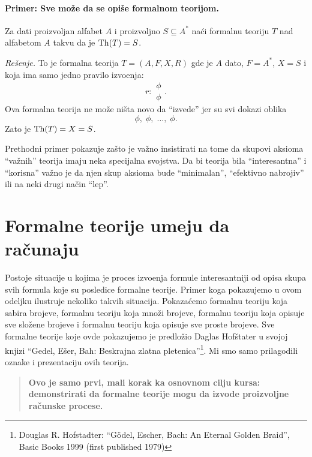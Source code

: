 \paragraph{Primer: Sve mo\v ze da se opi\v se formalnom teorijom.}
Za dati proizvoljan alfabet $A$ i proizvoljno $S \subseteq A^*$ na\'ci formalnu teoriju $T$ nad alfabetom
$A$ takvu da je $\mathrm{Th}(T) = S$.

\medskip

\noindent
\textit{Re\v senje.} To je formalna teorija $T = (A, F, X, R)$ gde je $A$ dato, $F = A^*$,
$X = S$ i koja ima samo jedno pravilo izvo\dj enja:
$$
  r : \begin{array}{c}
    \phi \\ \hline
    \phi
  \end{array}.
$$
Ova formalna teorija ne mo\v ze ni\v sta novo da ``izvede'' jer su svi dokazi oblika
$$
  \phi, \; \phi, \; \ldots, \; \phi.
$$
Zato je $\mathrm{Th}(T) = X = S$.

\bigskip

Prethodni primer pokazuje za\v sto je va\v zno insistirati na tome da skupovi aksioma ``va\v znih'' teorija
imaju neka specijalna svojstva. Da bi teorija bila ``interesantna'' i ``korisna'' va\v zno je da njen skup aksioma
bude ``minimalan'', ``efektivno nabrojiv'' ili na neki drugi na\v cin ``lep''.

\section{Formalne teorije umeju da ra\v cunaju}

Postoje situacije u kojima je proces izvo\dj enja formule interesantniji od opisa skupa svih formula
koje su posledice formalne teorije. Primer koga pokazujemo u ovom odeljku ilustruje nekoliko takvih situacija.
Pokaza\'cemo formalnu teoriju koja sabira brojeve, formalnu teoriju koja mno\v zi brojeve,
formalnu teoriju koja opisuje sve slo\v zene brojeve i
formalnu teoriju koja opisuje sve proste brojeve. Sve formalne teorije koje ovde pokazujemo
je predlo\v zio Daglas Hof\v stater u svojoj knjizi ``Gedel, E\v ser, Bah: Beskrajna zlatna pletenica''\footnote{%
  Douglas R. Hofstadter: ``G\"odel, Escher, Bach: An Eternal Golden Braid'',
  Basic Books 1999 (first published 1979)}. Mi smo samo prilagodili oznake i prezentaciju ovih teorija.

\begin{quote}
  \textbf{Ovo je samo prvi, mali korak ka osnovnom cilju kursa:
  demonstrirati da formalne teorije mogu da izvode proizvoljne ra\v cunske procese.}
\end{quote}


